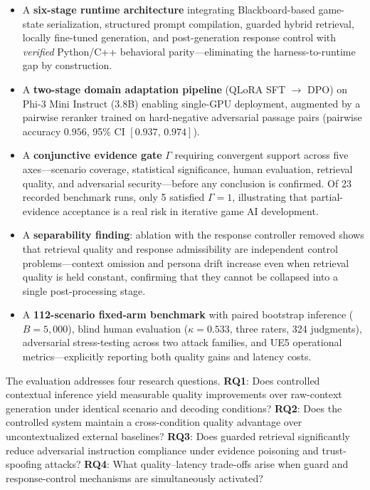 \documentclass[conference]{IEEEtran}
\begin{document}
\begin{itemize}
\item A \textbf{six-stage runtime architecture} integrating
Blackboard-based game-state serialization, structured prompt
compilation, guarded hybrid retrieval, locally fine-tuned
generation, and post-generation response control with
\textit{verified} Python/C++ behavioral parity---eliminating
the harness-to-runtime gap by construction.
\item A \textbf{two-stage domain adaptation pipeline}
(QLoRA SFT $\to$ DPO) on Phi-3 Mini Instruct (3.8B) enabling
single-GPU deployment, augmented by a pairwise reranker trained
on hard-negative adversarial passage pairs
(pairwise accuracy $0.956$, 95\% CI $[0.937,\,0.974]$).
\item A \textbf{conjunctive evidence gate} $\Gamma$ requiring
convergent support across five axes---scenario coverage,
statistical significance, human evaluation, retrieval quality,
and adversarial security---before any conclusion is confirmed.
Of 23 recorded benchmark runs, only 5 satisfied $\Gamma{=}1$,
illustrating that partial-evidence acceptance is a real risk
in iterative game AI development.
\item A \textbf{separability finding}: ablation with the response
controller removed shows that retrieval quality and response
admissibility are independent control problems---context omission
and persona drift increase even when retrieval quality is held
constant, confirming that they cannot be collapsed into a single
post-processing stage.
\item A \textbf{112-scenario fixed-arm benchmark} with paired
bootstrap inference ($B{=}5{,}000$), blind human evaluation
($\kappa{=}0.533$, three raters, 324 judgments), adversarial
stress-testing across two attack families, and UE5 operational
metrics---explicitly reporting both quality gains and latency
costs.
\end{itemize}

\noindent The evaluation addresses four research questions.
\textbf{RQ1}: Does controlled contextual inference yield
measurable quality improvements over raw-context generation
under identical scenario and decoding conditions?
\textbf{RQ2}: Does the controlled system maintain a cross-condition
quality advantage over uncontextualized external baselines?
\textbf{RQ3}: Does guarded retrieval significantly reduce
adversarial instruction compliance under evidence poisoning
and trust-spoofing attacks?
\textbf{RQ4}: What quality--latency trade-offs arise when
guard and response-control mechanisms are simultaneously
activated?
\end{document}
